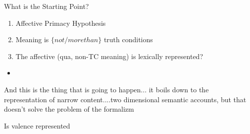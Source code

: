 \documentclass[12pt,letterpaper,table,svgnames,dvipsnames]{article}
\begin{document}
What is the Starting Point?
\begin{enumerate}
    \item Affective Primacy Hypothesis
    \item Meaning is $\{not / more than \}$ truth conditions
    \item The affective (qua, non-TC meaning) is lexically represented?
\end{enumerate}



\begin{itemize}
    \item 
\end{itemize}







And this is the thing that is going to happen...
it boils down to the representation of narrow content....two dimensional semantic accounts, but that doesn't solve the problem of the formalizm



\newpage





Is valence represented 
\end{document}
